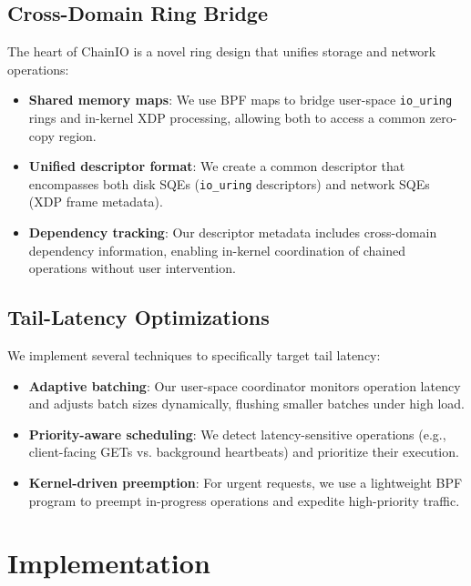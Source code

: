 \documentclass[sigconf,10pt]{acmart}
\newcommand{\sys}{ChainIO\xspace}
\begin{document}
\subsection{Cross-Domain Ring Bridge}

The heart of \sys is a novel ring design that unifies storage and network operations:

\begin{itemize}[leftmargin=*,itemsep=0pt]
  \item \textbf{Shared memory maps}: We use BPF maps to bridge user-space \texttt{io\_uring} rings and in-kernel XDP processing, allowing both to access a common zero-copy region.
  
  \item \textbf{Unified descriptor format}: We create a common descriptor that encompasses both disk SQEs (\texttt{io\_uring} descriptors) and network SQEs (XDP frame metadata).
  
  \item \textbf{Dependency tracking}: Our descriptor metadata includes cross-domain dependency information, enabling in-kernel coordination of chained operations without user intervention.
\end{itemize}

\subsection{Tail-Latency Optimizations}

We implement several techniques to specifically target tail latency:

\begin{itemize}[leftmargin=*,itemsep=0pt]
  \item \textbf{Adaptive batching}: Our user-space coordinator monitors operation latency and adjusts batch sizes dynamically, flushing smaller batches under high load.
  
  \item \textbf{Priority-aware scheduling}: We detect latency-sensitive operations (e.g., client-facing GETs vs. background heartbeats) and prioritize their execution.
  
  \item \textbf{Kernel-driven preemption}: For urgent requests, we use a lightweight BPF program to preempt in-progress operations and expedite high-priority traffic.
\end{itemize}

\section{Implementation}\label{sec:implementation}
\end{document}
